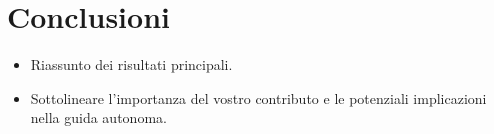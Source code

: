 \documentclass[conference]{IEEEtran}
\begin{document}

\section{Conclusioni}

\begin{itemize}
    \item Riassunto dei risultati principali.

    \item Sottolineare l'importanza del vostro contributo e le potenziali implicazioni nella guida autonoma.

\end{itemize}




\end{document}
